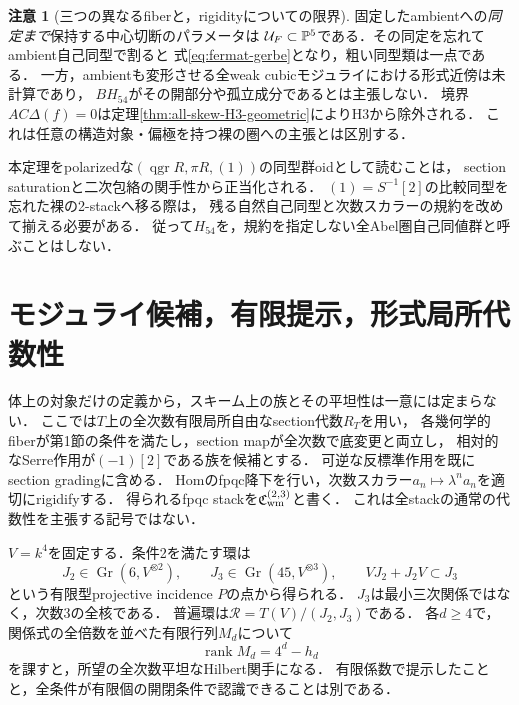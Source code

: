 \documentclass[11pt,a4paper]{ltjsarticle}
\theoremstyle{definition}\newtheorem{definition}[theorem]{定義}
\newtheorem{remark}[theorem]{注意}
\newcommand{\qgr}{\operatorname{qgr}}\newcommand{\Gr}{\operatorname{Gr}}
\newcommand{\rank}{\operatorname{rank}}\newcommand{\gldim}{\operatorname{gldim}}
\begin{document}
\begin{remark}[三つの異なるfiberと，rigidityについての限界]
固定したambientへの\emph{同定まで}保持する中心切断のパラメータは
$\mathcal U_F\subset\mathbb P^5$である．その同定を忘れてambient自己同型で割ると
式\eqref{eq:fermat-gerbe}となり，粗い同型類は一点である．
一方，ambientも変形させる全weak cubicモジュライにおける形式近傍は未計算であり，
$BH_{54}$がその開部分や孤立成分であるとは主張しない．
境界$AC\Delta(f)=0$は定理\ref{thm:all-skew-H3-geometric}によりH3から除外される．
これは任意の構造対象・偏極を持つ裸の圏への主張とは区別する．

本定理をpolarizedな$(\qgr R,\pi R,(1))$の同型群oidとして読むことは，
section saturationと二次包絡の関手性から正当化される．
$(1)=S^{-1}[2]$の比較同型を忘れた裸の2-stackへ移る際は，
残る自然自己同型と次数スカラーの規約を改めて揃える必要がある．
従って$H_{54}$を，規約を指定しない全Abel圏自己同値群と呼ぶことはしない．
\end{remark}

\section{モジュライ候補，有限提示，形式局所代数性}
体上の対象だけの定義から，スキーム上の族とその平坦性は一意には定まらない．
ここでは$T$上の全次数有限局所自由なsection代数$R_T$を用い，
各幾何学的fiberが第1節の条件を満たし，section mapが全次数で底変更と両立し，
相対的なSerre作用が$(-1)[2]$である族を候補とする．
可逆な反標準作用を既にsection gradingに含める．
Homのfpqc降下を行い，次数スカラー$a_n\mapsto\lambda^na_n$を適切にrigidifyする．
得られるfpqc stackを$\mathfrak C^{(2,3)}_{\mathrm{wm}}$と書く．
これは全stackの通常の代数性を主張する記号ではない．

$V=k^4$を固定する．条件2を満たす環は
\[
 J_2\in\Gr(6,V^{\otimes2}),\qquad
 J_3\in\Gr(45,V^{\otimes3}),\qquad
 VJ_2+J_2V\subset J_3
\]
という有限型projective incidence $P$の点から得られる．
$J_3$は最小三次関係ではなく，次数3の全核である．
普遍環は$\mathcal R=T(V)/(J_2,J_3)$である．
各$d\ge4$で，関係式の全倍数を並べた有限行列$M_d$について
\begin{equation}\label{eq:hilbert-ranks}
 \rank M_d=4^d-h_d
\end{equation}
を課すと，所望の全次数平坦なHilbert関手になる．
有限係数で提示したことと，全条件が有限個の開閉条件で認識できることは別である．
\end{document}
